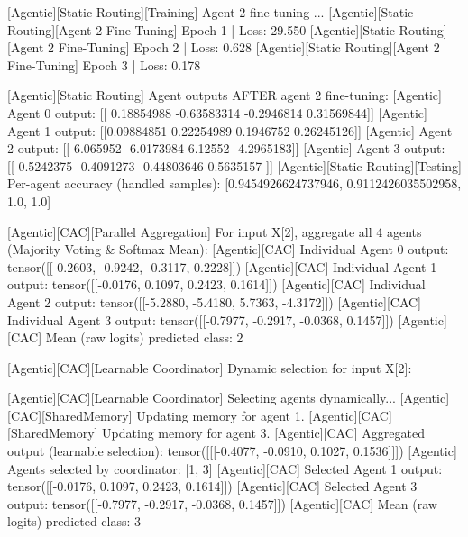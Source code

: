 [Agentic][Static Routing][Training] Agent 2 fine-tuning ...
[Agentic][Static Routing][Agent 2 Fine-Tuning] Epoch 1 | Loss: 29.550
[Agentic][Static Routing][Agent 2 Fine-Tuning] Epoch 2 | Loss: 0.628
[Agentic][Static Routing][Agent 2 Fine-Tuning] Epoch 3 | Loss: 0.178

[Agentic][Static Routing] Agent outputs AFTER agent 2 fine-tuning:
[Agentic] Agent 0 output: [[ 0.18854988 -0.63583314 -0.2946814   0.31569844]]
[Agentic] Agent 1 output: [[0.09884851 0.22254989 0.1946752  0.26245126]]
[Agentic] Agent 2 output: [[-6.065952  -6.0173984  6.12552   -4.2965183]]
[Agentic] Agent 3 output: [[-0.5242375  -0.4091273  -0.44803646  0.5635157 ]]
[Agentic][Static Routing][Testing] Per-agent accuracy (handled samples): [0.9454926624737946, 0.9112426035502958, 1.0, 1.0]

[Agentic][CAC][Parallel Aggregation] For input X[2], aggregate all 4 agents (Majority Voting & Softmax Mean):
[Agentic][CAC] Individual Agent 0 output: tensor([[ 0.2603, -0.9242, -0.3117,  0.2228]])
[Agentic][CAC] Individual Agent 1 output: tensor([[-0.0176,  0.1097,  0.2423,  0.1614]])
[Agentic][CAC] Individual Agent 2 output: tensor([[-5.2880, -5.4180,  5.7363, -4.3172]])
[Agentic][CAC] Individual Agent 3 output: tensor([[-0.7977, -0.2917, -0.0368,  0.1457]])
[Agentic][CAC] Mean (raw logits) predicted class: 2

[Agentic][CAC][Learnable Coordinator] Dynamic selection for input X[2]:

[Agentic][CAC][Learnable Coordinator] Selecting agents dynamically...
[Agentic][CAC][SharedMemory] Updating memory for agent 1.
[Agentic][CAC][SharedMemory] Updating memory for agent 3.
[Agentic][CAC] Aggregated output (learnable selection): tensor([[[-0.4077, -0.0910,  0.1027,  0.1536]]])
[Agentic] Agents selected by coordinator: [1, 3]
[Agentic][CAC] Selected Agent 1 output: tensor([[-0.0176,  0.1097,  0.2423,  0.1614]])
[Agentic][CAC] Selected Agent 3 output: tensor([[-0.7977, -0.2917, -0.0368,  0.1457]])
[Agentic][CAC] Mean (raw logits) predicted class: 3